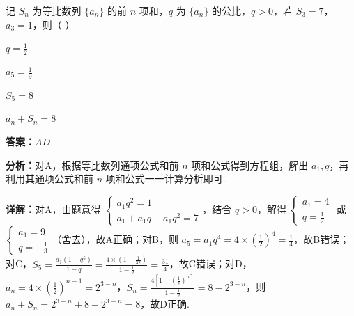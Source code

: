 \begin{question}[points=6]
记 $S_n$ 为等比数列 $\{a_n\}$ 的前 $n$ 项和，$q$ 为 $\{a_n\}$ 的公比，$q>0$，若 $S_3=7$，$a_3=1$，则（ ）
\begin{choices}
  \item $q=\frac{1}{2}$
  \item $a_5=\frac{1}{9}$
  \item $S_5=8$
  \item $a_n+S_n=8$
\end{choices}
\begin{solution}
\textbf{答案：}$AD$

\textbf{分析：}对A，根据等比数列通项公式和前 $n$ 项和公式得到方程组，解出 $a_1,q$，再利用其通项公式和前 $n$ 项和公式一一计算分析即可.

\textbf{详解：}对A，由题意得 $\begin{cases}a_1q^2=1\\a_1+a_1q+a_1q^2=7\end{cases}$，结合 $q>0$，解得 $\begin{cases}a_1=4\\q=\frac{1}{2}\end{cases}$ 或 $\begin{cases}a_1=9\\q=-\frac{1}{3}\end{cases}$（舍去），故A正确；对B，则 $a_5=a_1q^4=4\times\left(\frac{1}{2}\right)^4=\frac{1}{4}$，故B错误；对C，$S_5=\frac{a_1(1-q^5)}{1-q}=\frac{4\times\left(1-\frac{1}{32}\right)}{1-\frac{1}{2}}=\frac{31}{4}$，故C错误；对D，$a_n=4\times\left(\frac{1}{2}\right)^{n-1}=2^{3-n}$，$S_n=\frac{4\left[1-\left(\frac{1}{2}\right)^n\right]}{1-\frac{1}{2}}=8-2^{3-n}$，则 $a_n+S_n=2^{3-n}+8-2^{3-n}=8$，故D正确.
\end{solution}
\end{question}

